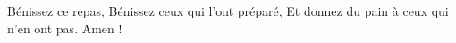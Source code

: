 \beginverse*
Bénissez ce repas,
Bénissez ceux qui l'ont préparé,
Et donnez du pain à ceux qui n'en ont pas.
Amen !
\endverse
\endsong
